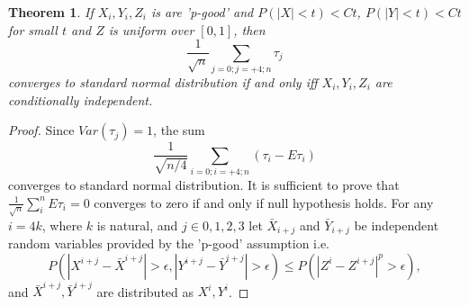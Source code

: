 \documentclass{article}
\newtheorem{Theorem}{Theorem}
\begin{document}
\begin{Theorem}
If $X_i,Y_i,Z_i$ is are 'p-good' and $P( |X| <t) <Ct$, $P( |Y| <t) <Ct$ for small $t$ and $Z$ is uniform over $[0,1]$, then
\[
 \frac{1}{\sqrt n} \sum_{j=0;j=+4;n} \tau_j   
\]
converges to standard normal distribution  if and only iff  $X_i,Y_i,Z_i$ are conditionally independent.
\end{Theorem}
\begin{proof}
Since $Var(\tau_j)=1$, the sum 
\[
 \frac{1}{\sqrt {n/4}} \sum_{i=0;i=+4;n} (\tau_i - E \tau_i)   
\]
converges to standard  normal distribution. It is sufficient to prove that $\frac{1} {\sqrt n} \sum_{i}^{n} E \tau_i=0$ converges to zero if and only if  null hypothesis holds. For any  $i=4k$, where $k$ is natural, and $j \in {0,1,2,3}$ let $\bar X_{i+j}$ and $\bar Y_{i+j}$ be independent random variables provided by the 'p-good' assumption i.e. 
\[
 P( |X^{i+j}- \bar X^{i+j}|>\epsilon,|Y^{i+j}- \bar Y^{i+j}|>\epsilon  ) \leq P(|Z^i-Z^{i+j}|^p>\epsilon),
\]
and $\bar X^{i+j},\bar Y^{i+j}$ are distributed as $X^i,Y^i$. 


\end{proof}
\end{document}
